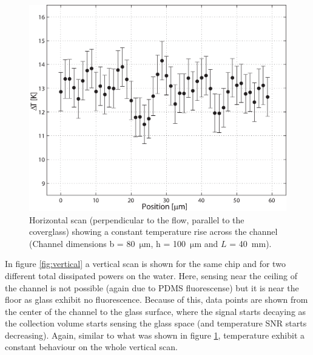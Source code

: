 \documentclass[twocolumn]{svjour3}       %
\begin{document}
\begin{figure}[h!]
\centering
\includegraphics[width=\columnwidth]{figs/fig5.eps}
\caption{Horizontal scan (perpendicular to the flow, parallel to the coverglass) showing a constant temperature rise across the channel (Channel dimensions  b = 80~$\mathrm{\mu m}$, h = 100~$\mathrm{\mu m}$ and $L$ = 40~mm).\label{fig:horizontal}}
\end{figure}

In figure \ref{fig:vertical} a vertical scan is shown for the same chip and for two different total dissipated powers on the water. Here, sensing near the ceiling of the channel is not possible (again due to PDMS fluorescense) but it is near the floor as glass exhibit no fluorescence. Because of this, data points are shown from the center of the channel to the glass surface, where the signal starts decaying as the collection volume starts sensing the glass space (and temperature SNR starts decreasing). Again, similar to what was shown in figure \ref{fig:horizontal}, temperature exhibit a constant behaviour on the whole vertical scan.
\end{document}
